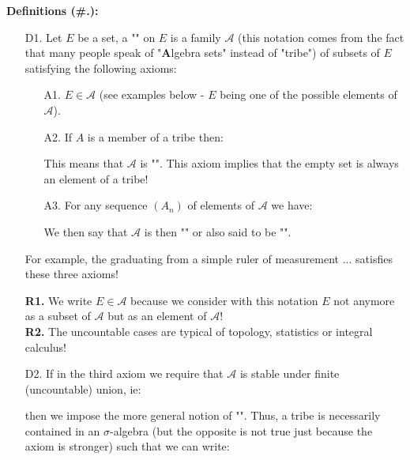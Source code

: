 	\textbf{Definitions (\#\thesection.\mydef):}
	\begin{enumerate}
		\item[D1.] Let $E$ be a set, a "" on $E$ is a family $\mathcal{A}$ (this notation comes from the fact that many people speak of "\textbf{A}lgebra sets" instead of "tribe") of subsets of $E$ satisfying the following axioms:
		\begin{enumerate}
			\item[A1.] $E\in \mathcal{A}$ (see examples below - $E$ being one of the possible elements of $\mathcal{A}$).
			
			\item[A2.] If $A$ is a member of a tribe then:
			
			This means that $\mathcal{A} $ is "". This axiom implies that the empty set is always an element of a tribe!
			
			\item[A3.] For any sequence $(A_n)$ of elements of $\mathcal{A}$ we have:
			
			 We then say that $\mathcal{A}$ is then "" or also said to be "".
		\end{enumerate}
		For example, the graduating from a simple ruler of measurement ... satisfies these three axioms!
	\begin{tcolorbox}[title=Remarks,arc=10pt,breakable,drop lifted shadow,
  skin=enhanced,
  skin first is subskin of={enhancedfirst}{arc=10pt,no shadow},
  skin middle is subskin of={enhancedmiddle}{arc=10pt,no shadow},
  skin last is subskin of={enhancedlast}{drop lifted shadow}]
	\textbf{R1.} We write $E\in \mathcal{A}$ because we consider with this notation $E$ not anymore as a subset of $\mathcal{A}$ but as an element of $\mathcal{A}$!\\
	
	\textbf{R2.} The uncountable cases are typical of topology, statistics or integral calculus!
	\end{tcolorbox}	
	
	\item[D2.] If in the third axiom we require that $\mathcal{A}$ is stable under finite (uncountable) union, ie:
	
	then we impose the more general notion of "\label{sigma algebra}". Thus, a tribe is necessarily contained in an $\sigma$-algebra (but the opposite is not true just because the axiom is stronger) such that we can write:
	

\end{enumerate}
